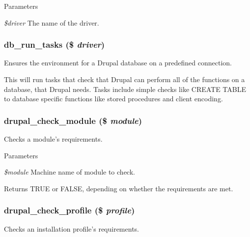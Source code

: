 \begin{DoxyParams}{Parameters}
\item[{\em \$driver}]The name of the driver. \end{DoxyParams}
\hypertarget{install_8inc_a57bfe6a3b39d6f931fe965a93e7eec83}{
\subsubsection[{db\_\-run\_\-tasks}]{\setlength{\rightskip}{0pt plus 5cm}db\_\-run\_\-tasks (\$ {\em driver})}}
\label{install_8inc_a57bfe6a3b39d6f931fe965a93e7eec83}
Ensures the environment for a Drupal database on a predefined connection.

This will run tasks that check that Drupal can perform all of the functions on a database, that Drupal needs. Tasks include simple checks like CREATE TABLE to database specific functions like stored procedures and client encoding. \hypertarget{install_8inc_a3b9fc21890b0b9307383a1f6a813b859}{
\subsubsection[{drupal\_\-check\_\-module}]{\setlength{\rightskip}{0pt plus 5cm}drupal\_\-check\_\-module (\$ {\em module})}}
\label{install_8inc_a3b9fc21890b0b9307383a1f6a813b859}
Checks a module's requirements.


\begin{DoxyParams}{Parameters}
\item[{\em \$module}]Machine name of module to check.\end{DoxyParams}
\begin{DoxyReturn}{Returns}
TRUE or FALSE, depending on whether the requirements are met. 
\end{DoxyReturn}
\hypertarget{install_8inc_a836bd8c91fc428e6d7c5bc6306dc6f5c}{
\subsubsection[{drupal\_\-check\_\-profile}]{\setlength{\rightskip}{0pt plus 5cm}drupal\_\-check\_\-profile (\$ {\em profile})}}
\label{install_8inc_a836bd8c91fc428e6d7c5bc6306dc6f5c}
Checks an installation profile's requirements.


